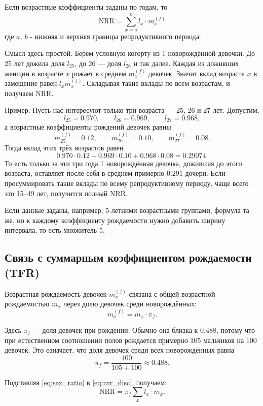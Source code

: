 \documentclass[a4paper, 14pt]{extarticle}
\begin{document}
Если возрастные коэффициенты заданы по годам, то
\begin{equation}
\text{NRR} = \sum_{x=a}^{b} l_x \cdot m_x^{(f)}
\label{eq:nrr_disc_new}
\end{equation}
где $a, \ b$ - нижняя и верхняя границы репродуктивного периода.

Смысл здесь простой. Берём условную когорту из 1 новорождённой девочки. До 25 лет дожила доля $l_{25}$, до 26 --- доля $l_{26}$ и так далее. Каждая из доживших женщин в возрасте $x$ рожает в среднем $m_x^{(f)}$ девочек. Значит вклад возраста $x$ в замещение равен $l_x m_x^{(f)}$. Складывая такие вклады по всем возрастам, и получаем NRR.

Пример. Пусть нас интересуют только три возраста --- 25, 26 и 27 лет. Допустим,
\[
l_{25}=0.970,\qquad l_{26}=0.969,\qquad l_{27}=0.968,
\]
а возрастные коэффициенты рождений девочек равны
\[
m_{25}^{(f)}=0.12,\qquad m_{26}^{(f)}=0.10,\qquad m_{27}^{(f)}=0.08.
\]
Тогда вклад этих трёх возрастов равен
\[
0.970\cdot 0.12 + 0.969\cdot 0.10 + 0.968\cdot 0.08 = 0.29074.
\]
То есть только за эти три года 1 новорождённая девочка, дожившая до этого возраста, оставляет после себя в среднем примерно $0.291$ дочери. Если просуммировать такие вклады по всему репродуктивному периоду, чаще всего это 15--49 лет, получится полный NRR.

Если данные заданы, например, 5-летними возрастными группами, формула та же, но к каждому коэффициенту рождаемости нужно добавить ширину интервала, то есть множитель 5.

\subsection{Связь с суммарным коэффициентом рождаемости (TFR)}

Возрастная рождаемость девочек $m_x^{(f)}$ связана с общей возрастной рождаемостью $m_x$ через долю девочек среди новорождённых:
\begin{equation}
m_x^{(f)} = m_x \cdot \pi_f.
\label{eq:sex_ratio}
\end{equation}

Здесь $\pi_f$ --- доля девочек при рождении. Обычно она близка к $0.488$, потому что при естественном соотношении полов рождается примерно 105 мальчиков на 100 девочек. Это означает, что доля девочек среди всех новорождённых равна
\[
\pi_f=\frac{100}{105+100}\approx 0.488.
\]

Подставляя \eqref{eq:sex_ratio} в \eqref{eq:nrr_disc}, получаем:
\begin{equation}
\text{NRR} = \pi_f \sum_{x} l_x \cdot m_x.
\label{eq:nrr_pi}
\end{equation}
\end{document}
